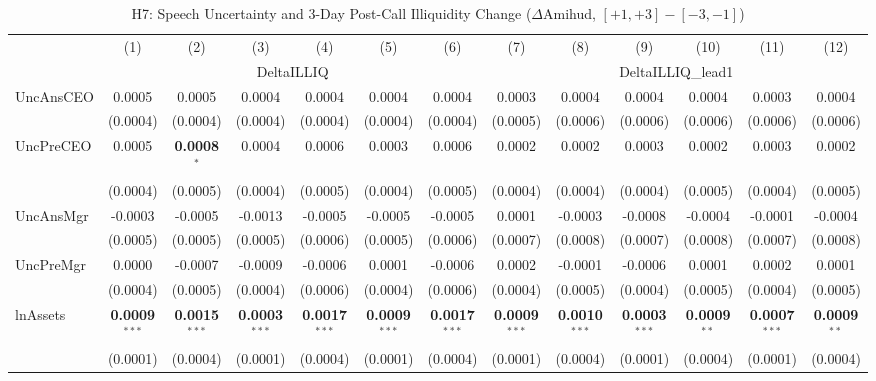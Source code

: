 \begin{landscape}
\begin{table}[H]
\setlength{\tabcolsep}{3pt}
\renewcommand{\arraystretch}{0.85}
\centering
\caption{H7: Speech Uncertainty and 3-Day Post-Call Illiquidity Change ($\Delta$Amihud, $[+1,+3]-[-3,-1]$)}
\label{tab:h7}
\scriptsize
\begin{tabular}{lcccccccccccc}
\toprule
 & (1) & (2) & (3) & (4) & (5) & (6) & (7) & (8) & (9) & (10) & (11) & (12) \\
 & \multicolumn{6}{c}{DeltaILLIQ} & \multicolumn{6}{c}{DeltaILLIQ\_lead1} \\
\cmidrule(lr){2-7} \cmidrule(lr){8-13}
\midrule
UncAnsCEO & 0.0005 & 0.0005 & 0.0004 & 0.0004 & 0.0004 & 0.0004 & 0.0003 & 0.0004 & 0.0004 & 0.0004 & 0.0003 & 0.0004 \\
 & (0.0004) & (0.0004) & (0.0004) & (0.0004) & (0.0004) & (0.0004) & (0.0005) & (0.0006) & (0.0006) & (0.0006) & (0.0006) & (0.0006) \\
UncPreCEO & 0.0005 & \textbf{0.0008}$^{*}$ & 0.0004 & 0.0006 & 0.0003 & 0.0006 & 0.0002 & 0.0002 & 0.0003 & 0.0002 & 0.0003 & 0.0002 \\
 & (0.0004) & (0.0005) & (0.0004) & (0.0005) & (0.0004) & (0.0005) & (0.0004) & (0.0004) & (0.0004) & (0.0005) & (0.0004) & (0.0005) \\
UncAnsMgr & -0.0003 & -0.0005 & -0.0013 & -0.0005 & -0.0005 & -0.0005 & 0.0001 & -0.0003 & -0.0008 & -0.0004 & -0.0001 & -0.0004 \\
 & (0.0005) & (0.0005) & (0.0005) & (0.0006) & (0.0005) & (0.0006) & (0.0007) & (0.0008) & (0.0007) & (0.0008) & (0.0007) & (0.0008) \\
UncPreMgr & 0.0000 & -0.0007 & -0.0009 & -0.0006 & 0.0001 & -0.0006 & 0.0002 & -0.0001 & -0.0006 & 0.0001 & 0.0002 & 0.0001 \\
 & (0.0004) & (0.0005) & (0.0004) & (0.0006) & (0.0004) & (0.0006) & (0.0004) & (0.0005) & (0.0004) & (0.0005) & (0.0004) & (0.0005) \\
\midrule
lnAssets & \textbf{0.0009}$^{***}$ & \textbf{0.0015}$^{***}$ & \textbf{0.0003}$^{***}$ & \textbf{0.0017}$^{***}$ & \textbf{0.0009}$^{***}$ & \textbf{0.0017}$^{***}$ & \textbf{0.0009}$^{***}$ & \textbf{0.0010}$^{***}$ & \textbf{0.0003}$^{***}$ & \textbf{0.0009}$^{**}$ & \textbf{0.0007}$^{***}$ & \textbf{0.0009}$^{**}$ \\
 & (0.0001) & (0.0004) & (0.0001) & (0.0004) & (0.0001) & (0.0004) & (0.0001) & (0.0004) & (0.0001) & (0.0004) & (0.0001) & (0.0004) \\

\end{tabular}
\end{table}
\end{landscape}
